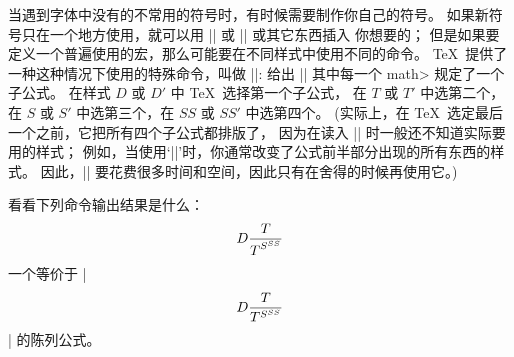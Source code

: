 \ddanger 当遇到字体中没有的不常用的符号时，有时候需要制作你自己的符号。%
如果新符号只在一个地方使用，就可以用 |\hbox| 或 |\vcenter| 或其它东西插入%
你想要的；
但是如果要定义一个普遍使用的宏，那么可能要在不同样式中使用不同的命令。%
 \TeX\ 提供了一种这种情况下使用的特殊命令，叫做 |\mathchoice|:
给出
\begindisplay
||
\enddisplay
其中每一个 \<math> 规定了一个子公式。%
在样式 $D$ 或 $D'$ 中 \TeX\ 选择第一个子公式，
在 $T$ 或 $T'$ 中选第二个，在 $S$ 或 $S'$ 中选第三个，在 $SS$ 或 $SS'$ 中选第四个。%
(实际上，在 \TeX\ 选定最后一个之前，它把所有四个子公式都排版了，
因为在读入 |\mathchoice| 时一般还不知道实际要用的样式；
例如，当使用`|\over|'时，你通常改变了公式前半部分出现的所有东西的样式。
因此，|\mathchoice| 要花费很多时间和空间，因此只有在舍得的时候再使用它。)

\ddangerexercise 看看下列命令输出结果是什么：
\begintt
\def\puzzle{{\mathchoice{D}{T}{S}{SS}}}
$$\puzzle{\puzzle\over\puzzle^{\puzzle^\puzzle}}$$
\endtt
\answer 一个等价于 |$${D}{{T}\over{T}^{{S}^{SS}}}$$| 的陈列公式。

